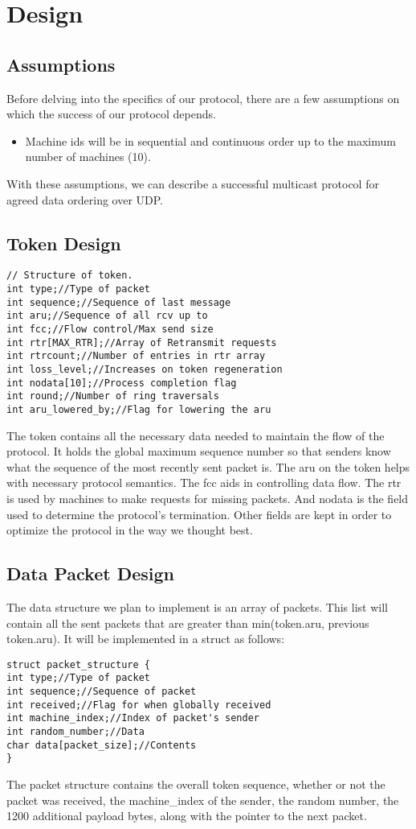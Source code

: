 \documentclass[12pt,journal,compsoc]{IEEEtran}
\begin{document}
\section{Design}
\subsection{Assumptions}
Before delving into the specifics of our protocol, there are a few assumptions on which the success of our protocol depends.
\begin{itemize}
\item Machine ids will be in sequential and continuous order up to the maximum number of machines (10).
\end{itemize}
With these assumptions, we can describe a successful multicast protocol for agreed data ordering over UDP.
\subsection{Token Design}
\begin{lstlisting}
// Structure of token.
int type;//Type of packet
int sequence;//Sequence of last message
int aru;//Sequence of all rcv up to
int fcc;//Flow control/Max send size
int rtr[MAX_RTR];//Array of Retransmit requests
int rtrcount;//Number of entries in rtr array
int loss_level;//Increases on token regeneration
int nodata[10];//Process completion flag
int round;//Number of ring traversals
int aru_lowered_by;//Flag for lowering the aru
\end{lstlisting}
The token contains all the necessary data needed to maintain the flow of the protocol. It holds the global maximum sequence number so that senders know what the sequence of the most recently sent packet is. The aru on the token helps with necessary protocol semantics. The fcc aids in controlling data flow. The rtr is used by machines to make requests for missing packets. And nodata is the field used to determine the protocol's termination. Other fields are kept in order to optimize the protocol in the way we thought best.

\subsection{Data Packet Design}
The data structure we plan to implement is an array of packets. This list will contain all the sent packets that are greater than min(token.aru, previous token.aru). It will be implemented in a struct as follows:
\begin{lstlisting}
struct packet_structure {
int type;//Type of packet
int sequence;//Sequence of packet
int received;//Flag for when globally received
int machine_index;//Index of packet's sender
int random_number;//Data
char data[packet_size];//Contents
}
\end{lstlisting}
The packet structure contains the overall token sequence, whether or not the packet was received, the machine\_index of the sender, the random number, the 1200 additional payload bytes, along with the pointer to the next packet.
\end{document}
